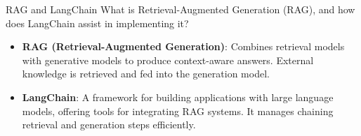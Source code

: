 \documentclass{article}
\begin{document}
\begin{exercise}{RAG and LangChain}\label{ex:rag}
  What is Retrieval-Augmented Generation (RAG), and how does LangChain assist in implementing it?

  \begin{solution}
    \begin{itemize}
        \item \textbf{RAG (Retrieval-Augmented Generation)}: Combines retrieval models with generative models to produce context-aware answers. External knowledge is retrieved and fed into the generation model.
        \item \textbf{LangChain}: A framework for building applications with large language models, offering tools for integrating RAG systems. It manages chaining retrieval and generation steps efficiently.
    \end{itemize}
  \end{solution}
\end{exercise}
\end{document}
